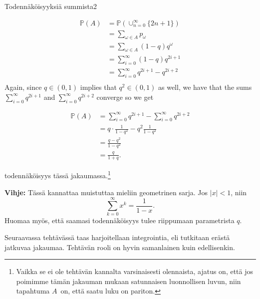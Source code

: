 \documentclass[11pt,a4paper]{amsart}
\newcommand{\1}{\mathbf{1}}
\renewcommand{\P}{\mathbb P}
\begin{document}
\begin{Exercises}{Todennäköisyyksiä summista}{2}
\begin{enumerate}
    \begin{align*}
	\P(A) &= \P(\cup_{n=0}^{\infty} \{ 2n+1 \}) \\
	      &= \sum_{\omega \in A}  p_{\omega} \\
	      &= \sum_{\omega \in A} (1-q)q^{\omega} \\
	      &= \sum_{i=0}^{\infty} (1-q) q^{2i+1} \\
	      &= \sum_{i=0}^{\infty} q^{2i+1} - q^{2i+2} \\
    \end{align*}
    Again, since $ q \in (0,1)$ implies that $ q^{2} \in (0,1)$ as well, we have that the sums $ \sum_{i=0}^{\infty} q^{2i+1} $ and
    $ \sum_{i=0}^{\infty} q^{2i+2} $ converge so we get  

    \begin{align*}
	\P(A) &= \sum_{i=0}^{\infty} q^{2i+1} - \sum_{i=0}^{\infty} q^{2i+2} \\
	      &= q \cdot \frac{1}{1-q^2} - q^2 \frac{1}{1-q^2} \\
	      &= \frac{q-q^2}{1-q^2}\\
	      &= \frac{q}{1+q}.
    \end{align*}
    
todennäköisyys tässä jakaumassa.\footnote{Vaikka se ei ole tehtävän kannalta varsinaisesti olennaista, ajatus on, että jos poimimme tämän jakauman mukaan satunnaisen luonnollisen luvun, niin tapahtuma $A$ on, että saatu luku on pariton.}
\end{enumerate}
{\bf Vihje:} Tässä kannattaa muistuttaa mieliin geometrinen sarja. Jos $|x|<1$, niin 
\[
\sum_{k=0}^\infty x^k=\frac{1}{1-x}.
\]
Huomaa myös, että saamasi todennäköisyys tulee riippumaan parametrista $q$.
\end{Exercises}


Seuraavassa tehtävässä taas harjoitellaan integrointia, eli tutkitaan erästä jatkuvaa jakaumaa. Tehtävän rooli on hyvin samanlainen kuin edellisenkin.
\end{document}
